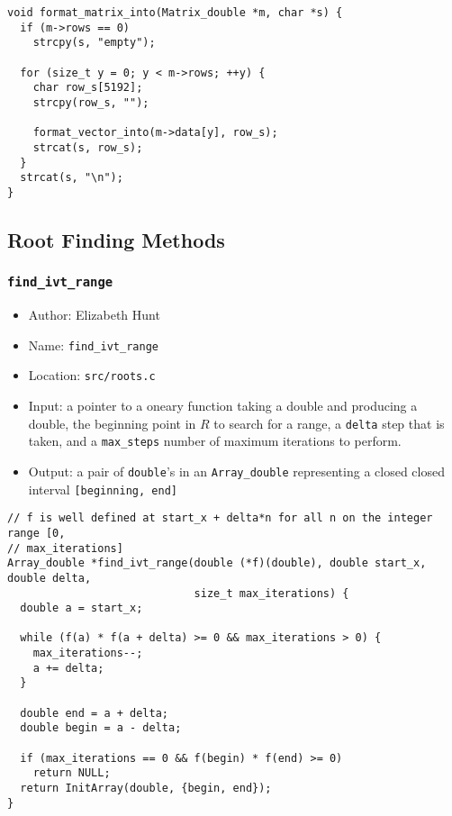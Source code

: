 \documentclass[11pt]{article}
\begin{document}
\begin{verbatim}
void format_matrix_into(Matrix_double *m, char *s) {
  if (m->rows == 0)
    strcpy(s, "empty");

  for (size_t y = 0; y < m->rows; ++y) {
    char row_s[5192];
    strcpy(row_s, "");

    format_vector_into(m->data[y], row_s);
    strcat(s, row_s);
  }
  strcat(s, "\n");
}
\end{verbatim}
\subsection{Root Finding Methods}
\label{sec:org352ccdf}
\subsubsection{\texttt{find\_ivt\_range}}
\label{sec:orgb9a0d16}
\begin{itemize}
\item Author: Elizabeth Hunt
\item Name: \texttt{find\_ivt\_range}
\item Location: \texttt{src/roots.c}
\item Input: a pointer to a oneary function taking a double and producing a double, the beginning point
in \(R\) to search for a range, a \texttt{delta} step that is taken, and a \texttt{max\_steps} number of maximum
iterations to perform.
\item Output: a pair of \texttt{double}'s in an \texttt{Array\_double} representing a closed closed interval \texttt{[beginning, end]}
\end{itemize}

\begin{verbatim}
// f is well defined at start_x + delta*n for all n on the integer range [0,
// max_iterations]
Array_double *find_ivt_range(double (*f)(double), double start_x, double delta,
                             size_t max_iterations) {
  double a = start_x;

  while (f(a) * f(a + delta) >= 0 && max_iterations > 0) {
    max_iterations--;
    a += delta;
  }

  double end = a + delta;
  double begin = a - delta;

  if (max_iterations == 0 && f(begin) * f(end) >= 0)
    return NULL;
  return InitArray(double, {begin, end});
}
\end{verbatim}
\end{document}
